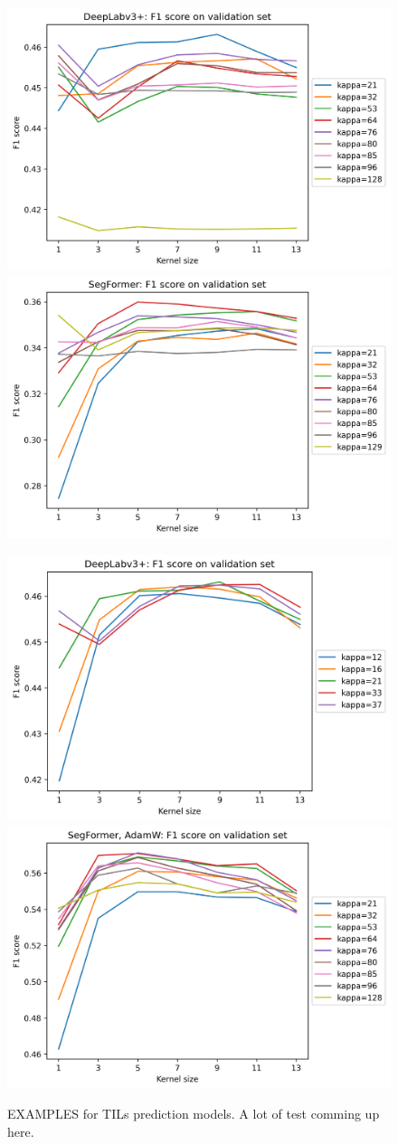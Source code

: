 \begin{figure}
\includegraphics[width=.5\linewidth]{figures/tils/deeplabv3+_f1_kappas_kernels_plot.png}
\includegraphics[width=.5\linewidth]{figures/tils/segformer_f1_kappas_kernels_plot.png}

\includegraphics[width=.5\linewidth]{figures/tils/deeplabv3+_f1_kappas_kernels_plot_zooomed.png}
\includegraphics[width=.5\linewidth]{figures/tils/segformer,_adamw_f1_kappas_kernels_plot.png}

\caption{EXAMPLES for TILs prediction models. A lot of test comming up here.}
\label{fig:figure3}

\end{figure}


